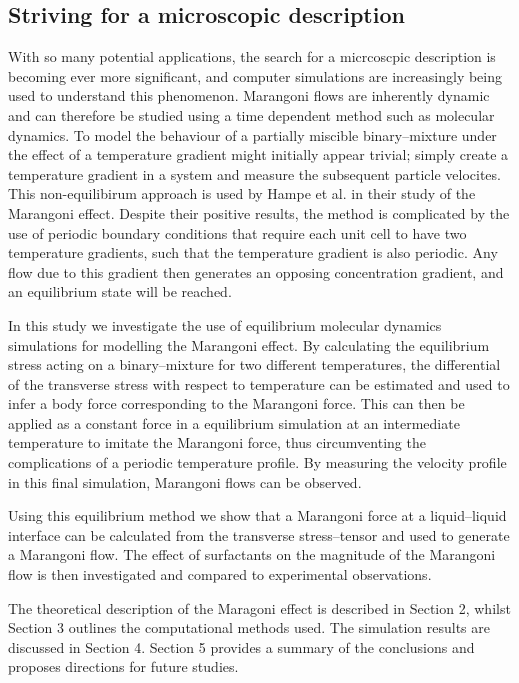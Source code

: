 \subsection{Striving for a microscopic description}
With so many potential applications, the search for a micrcoscpic description is becoming ever more significant, and computer simulations are increasingly being used to understand this phenomenon.
Marangoni flows are inherently dynamic and can therefore be studied using a time dependent method such as molecular dynamics.
To model the behaviour of a partially miscible binary--mixture under the effect of a temperature gradient might initially appear trivial; simply create a temperature gradient in a system and measure the subsequent particle velocites.
This non-equilibirum approach is used by Hampe et al. in their study of the Marangoni effect.\cite{HolgerBoppHampe}
Despite their positive results, the method is complicated by the use of periodic boundary conditions that require each unit cell to have two temperature gradients, such that the temperature gradient is also periodic.
Any flow due to this gradient then generates an opposing concentration gradient, and an equilibrium state will be reached.

In this study we investigate the use of equilibrium molecular dynamics simulations for modelling the Marangoni effect.
By calculating the equilibrium stress acting on a binary--mixture for two different temperatures, the differential of the transverse stress with respect to temperature can be estimated and used to infer a body force corresponding to the Marangoni force.
This can then be applied as a constant force in a equilibrium simulation at an intermediate temperature to imitate the Marangoni force, thus circumventing the complications of a periodic temperature profile.
By measuring the velocity profile in this final simulation, Marangoni flows can be observed.

Using this equilibrium method we show that a Marangoni force at a liquid--liquid interface can be calculated from the transverse stress--tensor and used to generate a Marangoni flow.
The effect of surfactants on the magnitude of the Marangoni flow is then investigated and compared to experimental observations.

The theoretical description of the Maragoni effect is described in Section 2, whilst Section 3 outlines the computational methods used.
The simulation results are discussed in Section 4.
Section 5 provides a summary of the conclusions and proposes directions for future studies.
